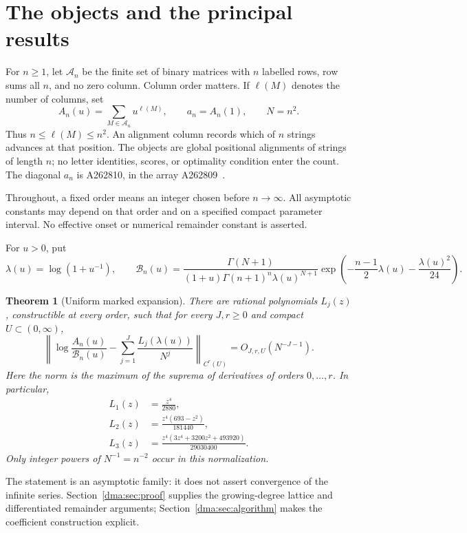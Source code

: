 \documentclass[11pt,letterpaper]{article}
\newtheorem{theorem}{Theorem}[section]
\theoremstyle{remark}\newtheorem{remark}[theorem]{Remark}
\begin{document}
\section{The objects and the principal results}
For $n\geq1$, let $\mathcal A_n$ be the finite set of binary matrices with $n$ labelled rows, row sums all $n$, and no zero column. Column order matters. If $\ell(M)$ denotes the number of columns, set
\[
 A_n(u)=\sum_{M\in\mathcal A_n}u^{\ell(M)},\qquad a_n=A_n(1),\qquad N=n^2.
\]
Thus $n\leq\ell(M)\leq n^2$. An alignment column records which of $n$ strings advances at that position. The objects are global positional alignments of strings of length $n$; no letter identities, scores, or optimality condition enter the count. The diagonal $a_n$ is A262810, in the array A262809~\cite{oeisdiag,oeisarray}.

Throughout, a fixed order means an integer chosen before $n\to\infty$. All asymptotic constants may depend on that order and on a specified compact parameter interval. No effective onset or numerical remainder constant is asserted.

For $u>0$, put
\begin{equation}\label{dma:eq:carrier}
 \lambda(u)=\log(1+u^{-1}),\qquad
 \mathcal B_n(u)=\frac{\Gamma(N+1)}{(1+u)\Gamma(n+1)^n\lambda(u)^{N+1}}
 \exp\left(-\frac{n-1}{2}\lambda(u)-\frac{\lambda(u)^2}{24}\right).
\end{equation}
\begin{theorem}[Uniform marked expansion]\label{dma:thm:main}
There are rational polynomials $L_j(z)$, constructible at every order, such that for every $J,r\geq0$ and compact $U\subset(0,\infty)$,
\begin{equation}\label{dma:eq:main}
 \left\|\log\frac{A_n(u)}{\mathcal B_n(u)}-
 \sum_{j=1}^J\frac{L_j(\lambda(u))}{N^j}\right\|_{C^r(U)}
 =O_{J,r,U}(N^{-J-1}).
\end{equation}
Here the norm is the maximum of the suprema of derivatives of orders $0,\ldots,r$. In particular,
\begin{align}
 L_1(z)&=\frac{z^4}{2880},\label{dma:eq:L1}\\
 L_2(z)&=\frac{z^4(693-z^2)}{181440},\label{dma:eq:L2}\\
 L_3(z)&=\frac{z^4(3z^4+3200z^2+493920)}{29030400}.\label{dma:eq:L3}
\end{align}
Only integer powers of $N^{-1}=n^{-2}$ occur in this normalization.
\end{theorem}
The statement is an asymptotic family: it does not assert convergence of the infinite series. Section~\ref{dma:sec:proof} supplies the growing-degree lattice and differentiated remainder arguments; Section~\ref{dma:sec:algorithm} makes the coefficient construction explicit.
\end{document}
